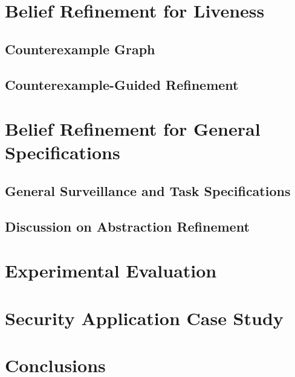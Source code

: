 \section{Belief Refinement for Liveness}%
\subsection{Counterexample Graph}

\subsection{Counterexample-Guided Refinement}

%
%
\section{Belief Refinement for General Specifications}%
%
\subsection{General Surveillance and Task Specifications}

\subsection{Discussion on Abstraction Refinement}

%
\section{Experimental Evaluation}\label{sec:experiments}

%
%
\section{Security Application Case Study}
%


%
%
%
\section{Conclusions}


